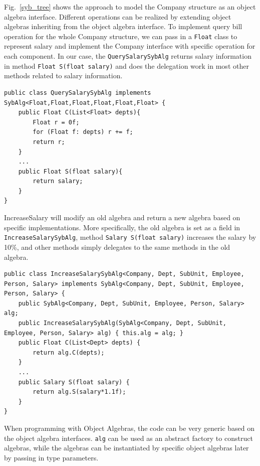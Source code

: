 Fig.~\ref{syb_tree} shows the approach to model the Company
structure as an object algebra interface. Different operations can be realized by extending object algebras inheriting from the object algebra interface. To implement query bill
operation for the whole Company structure, we can pass in a \lstinline{Float} class to represent salary and implement the
Company interface with specific operation for each component. In our case, the \lstinline{QuerySalarySybAlg} returns salary information in method \lstinline{Float S(float salary)} and does the delegation work in most other methods related to salary information.

\begin{lstlisting}[numbers=none] 
public class QuerySalarySybAlg implements SybAlg<Float,Float,Float,Float,Float,Float> {
	public Float C(List<Float> depts){
		Float r = 0f;
		for (Float f: depts) r += f;
		return r;
	}
	...
	public Float S(float salary){
		return salary;
	}
}
\end{lstlisting}

IncreaseSalary will modify an old algebra and return a new algebra based on specific implementations. More specifically, the old algebra is set as a field in \lstinline{IncreaseSalarySybAlg}, method  \lstinline{Salary S(float salary)} increases the salary by 10\%, and other methods simply delegates to the same methods in the old algebra. 

\begin{lstlisting}[numbers=none]
public class IncreaseSalarySybAlg<Company, Dept, SubUnit, Employee, Person, Salary> implements SybAlg<Company, Dept, SubUnit, Employee, Person, Salary> {
	public SybAlg<Company, Dept, SubUnit, Employee, Person, Salary> alg;
	public IncreaseSalarySybAlg(SybAlg<Company, Dept, SubUnit, Employee, Person, Salary> alg) { this.alg = alg; }
	public Float C(List<Dept> depts) {
		return alg.C(depts);
	}
	...
	public Salary S(float salary) {
		return alg.S(salary*1.1f);
	}
}
\end{lstlisting}

  
When programming with Object Algebras, the code can be very generic based on the object algebra interfaces. \lstinline{alg} can be used as an abstract factory to construct algebras, while the algebras can be instantiated by specific object algebras later by passing in type parameters. 

